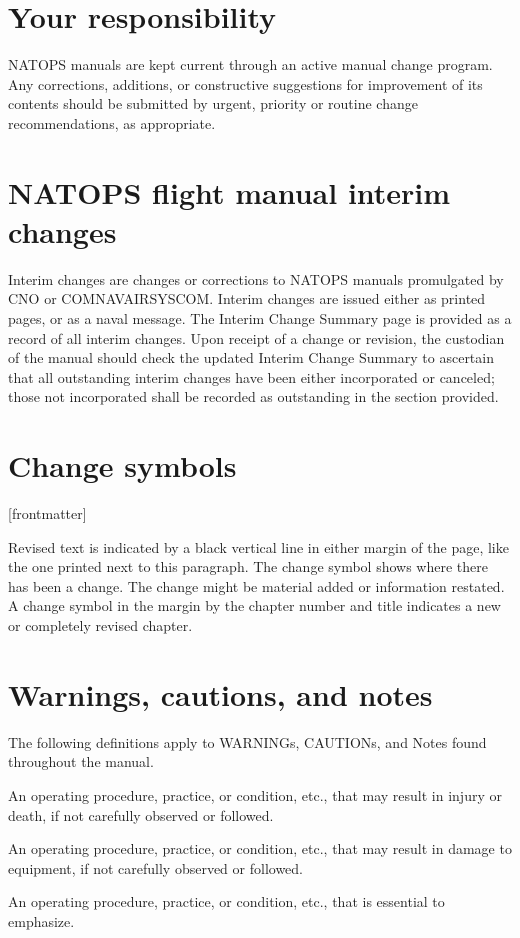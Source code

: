 \documentclass{book}
\begin{document}
\section*{Your responsibility}
NATOPS manuals are kept current through an active manual change program. Any corrections, additions, or constructive suggestions for improvement of its contents should be submitted by urgent, priority or routine change recommendations, as appropriate.

\section*{NATOPS flight manual interim changes}
Interim changes are changes or corrections to NATOPS manuals promulgated by CNO or COMNAVAIRSYSCOM. Interim changes are issued either as printed pages, or as a naval message. The Interim Change Summary page is provided as a record of all interim changes. Upon receipt of a change or revision, the custodian of the manual should check the updated Interim Change Summary to ascertain that all outstanding interim changes have been either incorporated or canceled; those not incorporated shall be recorded as outstanding in the section provided.

\section*{Change symbols}
[frontmatter]{%
}
\thispagestyle{rev1}
\begin{changebar}
Revised text is indicated by a black vertical line in either margin of the page, like the one printed next to this paragraph. The change symbol shows where there has been a change. The change might be material added or information restated. A change symbol in the margin by the chapter number and title indicates a new or completely revised chapter.
\end{changebar}
  
\section*{Warnings, cautions, and notes}
The following definitions apply to WARNINGs, CAUTIONs, and Notes found throughout the manual.
\begin{warning}
An operating procedure, practice, or condition, etc., that may result in injury or death, if not carefully observed or followed.
\end{warning}
\begin{caution}
An operating procedure, practice, or condition, etc., that may result in damage to equipment, if not carefully observed or followed.
\end{caution}
\begin{note}
An operating procedure, practice, or condition, etc., that is essential to emphasize.
\end{note}
\end{document}
